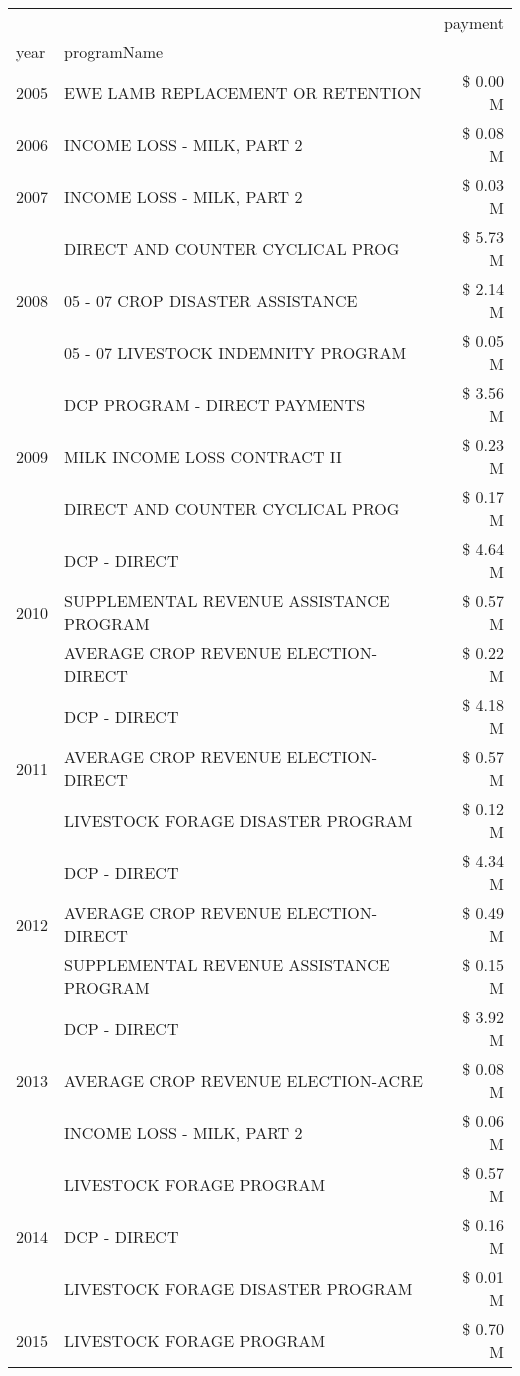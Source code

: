 \begin{tabular}{llr}
\toprule
 &  & payment \\
year & programName &  \\
\midrule
2005 & EWE LAMB REPLACEMENT OR RETENTION & \$ 0.00 M \\
\cline{1-3}
2006 & INCOME LOSS - MILK, PART 2 & \$ 0.08 M \\
\cline{1-3}
2007 & INCOME LOSS - MILK, PART 2 & \$ 0.03 M \\
\cline{1-3}
\multirow[t]{3}{*}{2008} & DIRECT AND COUNTER CYCLICAL PROG & \$ 5.73 M \\
 & 05 - 07 CROP DISASTER ASSISTANCE & \$ 2.14 M \\
 & 05 - 07 LIVESTOCK INDEMNITY PROGRAM & \$ 0.05 M \\
\cline{1-3}
\multirow[t]{3}{*}{2009} & DCP PROGRAM - DIRECT PAYMENTS & \$ 3.56 M \\
 & MILK INCOME LOSS CONTRACT II & \$ 0.23 M \\
 & DIRECT AND COUNTER CYCLICAL PROG & \$ 0.17 M \\
\cline{1-3}
\multirow[t]{3}{*}{2010} & DCP - DIRECT & \$ 4.64 M \\
 & SUPPLEMENTAL REVENUE ASSISTANCE PROGRAM & \$ 0.57 M \\
 & AVERAGE CROP REVENUE ELECTION-DIRECT & \$ 0.22 M \\
\cline{1-3}
\multirow[t]{3}{*}{2011} & DCP - DIRECT & \$ 4.18 M \\
 & AVERAGE CROP REVENUE ELECTION-DIRECT & \$ 0.57 M \\
 & LIVESTOCK FORAGE DISASTER PROGRAM & \$ 0.12 M \\
\cline{1-3}
\multirow[t]{3}{*}{2012} & DCP - DIRECT & \$ 4.34 M \\
 & AVERAGE CROP REVENUE ELECTION-DIRECT & \$ 0.49 M \\
 & SUPPLEMENTAL REVENUE ASSISTANCE PROGRAM & \$ 0.15 M \\
\cline{1-3}
\multirow[t]{3}{*}{2013} & DCP - DIRECT & \$ 3.92 M \\
 & AVERAGE CROP REVENUE ELECTION-ACRE & \$ 0.08 M \\
 & INCOME LOSS - MILK, PART 2 & \$ 0.06 M \\
\cline{1-3}
\multirow[t]{3}{*}{2014} & LIVESTOCK FORAGE PROGRAM & \$ 0.57 M \\
 & DCP - DIRECT & \$ 0.16 M \\
 & LIVESTOCK FORAGE DISASTER PROGRAM & \$ 0.01 M \\
\cline{1-3}
\multirow[t]{3}{*}{2015} & LIVESTOCK FORAGE PROGRAM & \$ 0.70 M \\

\end{tabular}

